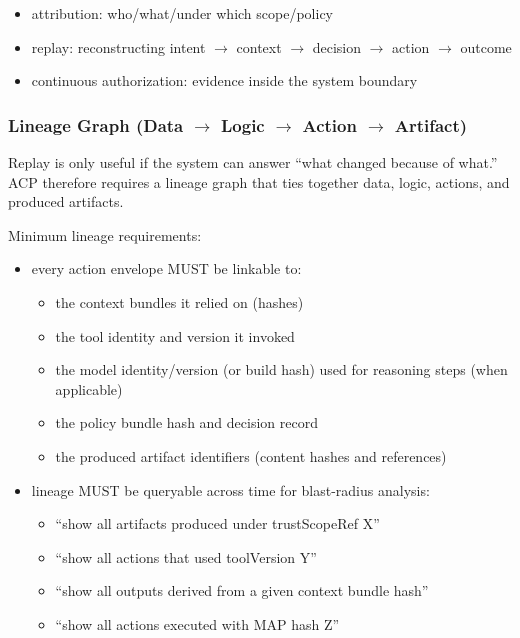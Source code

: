 \documentclass[11pt]{article}
\begin{document}
\begin{itemize}
\tightlist
\item
  attribution: who/what/under which scope/policy
\item
  replay: reconstructing intent \ensuremath{\rightarrow} context \ensuremath{\rightarrow} decision \ensuremath{\rightarrow} action \ensuremath{\rightarrow} outcome
\item
  continuous authorization: evidence inside the system boundary
\end{itemize}

\hypertarget{lineage-graph-data-logic-action-artifact}{%
\subsubsection{Lineage Graph (Data \ensuremath{\rightarrow} Logic \ensuremath{\rightarrow} Action \ensuremath{\rightarrow} Artifact)}\label{lineage-graph-data-logic-action-artifact}}

Replay is only useful if the system can answer ``what changed because of
what.'' ACP therefore requires a lineage graph that ties together data,
logic, actions, and produced artifacts.

Minimum lineage requirements:

\begin{itemize}
\tightlist
\item
  every action envelope MUST be linkable to:

  \begin{itemize}
  \tightlist
  \item
    the context bundles it relied on (hashes)
  \item
    the tool identity and version it invoked
  \item
    the model identity/version (or build hash) used for reasoning steps
    (when applicable)
  \item
    the policy bundle hash and decision record
  \item
    the produced artifact identifiers (content hashes and references)
  \end{itemize}
\item
  lineage MUST be queryable across time for blast-radius analysis:

  \begin{itemize}
  \tightlist
  \item
    ``show all artifacts produced under trustScopeRef X''
  \item
    ``show all actions that used toolVersion Y''
  \item
    ``show all outputs derived from a given context bundle hash''
  \item
    ``show all actions executed with MAP hash Z''
  \end{itemize}
\end{itemize}
\end{document}
